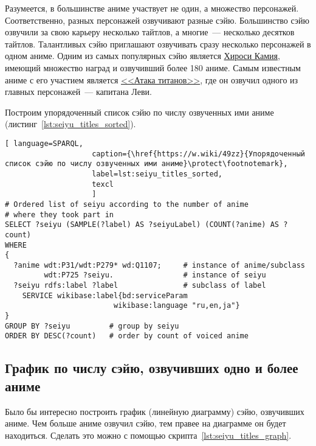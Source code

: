 Разумеется, в большинстве аниме участвует не один, а множество персонажей. Соответственно, разных персонажей озвучивают разные сэйю. Большинство сэйю озвучили за свою карьеру несколько тайтлов, а многие~--- несколько десятков тайтлов. Талантливых сэйю приглашают озвучивать сразу несколько персонажей в одном аниме. Одним из самых популярных сэйю является \href{https://w.wiki/4L5q}{Хироси Камия}, имеющий множество наград и озвучивший более 180 аниме. Самым известным аниме с его участием является \href{https://w.wiki/4L5r}{<<Атака титанов>>}, где он озвучил одного из главных персонажей~--- капитана Леви.

Построим упорядоченный список сэйю по числу озвученных ими аниме (листинг~\protect\ref{lst:seiyu_titles_sorted}).

\begin{lstlisting}[ language=SPARQL, 
                    caption={\href{https://w.wiki/49zz}{Упорядоченный список сэйю по числу озвученных ими аниме}\protect\footnotemark},
                    label=lst:seiyu_titles_sorted,
                    texcl 
                    ]
# Ordered list of seiyu according to the number of anime
# where they took part in
SELECT ?seiyu (SAMPLE(?label) AS ?seiyuLabel) (COUNT(?anime) AS ?count)
WHERE
{
  ?anime wdt:P31/wdt:P279* wd:Q1107;	 # instance of anime/subclass
         wdt:P725 ?seiyu. 	             # instance of seiyu
  ?seiyu rdfs:label ?label	             # subclass of label
    SERVICE wikibase:label{bd:serviceParam
					     wikibase:language "ru,en,ja"}
}
GROUP BY ?seiyu		    # group by seiyu 
ORDER BY DESC(?count)	# order by count of voiced anime
\end{lstlisting}%

\subsection{График по числу сэйю, озвучивших одно и более аниме}

Было бы интересно построить график (линейную диаграмму) сэйю, озвучивших аниме. Чем больше аниме озвучил сэйю, тем правее на диаграмме он будет находиться. Сделать это можно с помощью скрипта~\protect\ref{lst:seiyu_titles_graph}.

